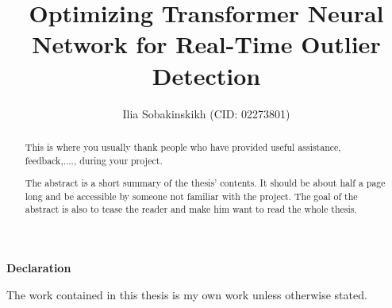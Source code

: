 \documentclass[a4paper, twoside]{report}
\title{Optimizing Transformer Neural Network for Real-Time Outlier Detection}
\author{Ilia Sobakinskikh  (CID: 02273801)}
\theoremstyle{definition}
\newtheorem{remark}[theorem]{Remark}
\numberwithin{equation}{section}
\begin{document}


\mbox{}\newline\vspace{10mm} \mbox{}\LARGE
%
{\bf Declaration} \normalsize \vspace{5mm}

The work contained in this thesis is my own work unless otherwise stated.

\newpage

\renewcommand{\abstractname}{Acknowledgements}
\begin{abstract}
    This is where you usually thank people who have provided useful assistance, feedback,...., during your project.
\end{abstract}

\newpage

\renewcommand{\abstractname}{Abstract}
\begin{abstract}
    The abstract is a short summary of the thesis' contents.
    It should be about half a page long and be accessible by someone not familiar with the project.
    The goal of the abstract is also to tease the reader and make him want to read the whole thesis.
\end{abstract}

\tableofcontents
\listoffigures
\listoftables










\end{document}
